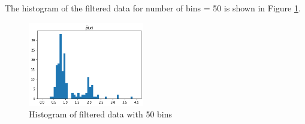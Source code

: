 The histogram of the filtered data for number of bins = 50 is shown in Figure \ref{fig:q1_2_e}.

\begin{figure}[H]
    \centering
    \includegraphics[width=0.45\textwidth]{../q1/images/optimalhistogram.png}
    \caption{Histogram of filtered data with 50 bins}
    \label{fig:q1_2_e}
\end{figure}

\newpage